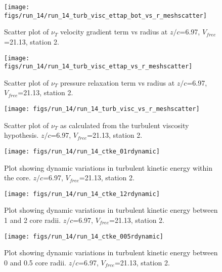 \begin{figure}[H]
\centering
\texttt{[image: figs/run\_14/run\_14\_turb\_visc\_ettap\_bot\_vs\_r\_meshscatter]}
\caption{Scatter plot of $\nu_T$ velocity gradient term vs radius at $z/c$=6.97, $V_{free}$=21.13, station 2.}
\end{figure}


\begin{figure}[H]
\centering
\texttt{[image: figs/run\_14/run\_14\_turb\_visc\_ettap\_vs\_r\_meshscatter]}
\caption{Scatter plot of $\nu_T$ pressure relaxation term vs radius at $z/c$=6.97, $V_{free}$=21.13, station 2.}
\end{figure}


\begin{figure}[H]
\centering
\texttt{[image: figs/run\_14/run\_14\_turb\_visc\_vs\_r\_meshscatter]}
\caption{Scatter plot of $\nu_T$ as calculated from the turbulent viscosity hypothesis. $z/c$=6.97, $V_{free}$=21.13, station 2.}
\end{figure}


\begin{figure}[H]
\centering
\texttt{[image: figs/run\_14/run\_14\_ctke\_01rdynamic]}
\caption{Plot showing dynamic variations in turbulent kinetic energy within the core. $z/c$=6.97, $V_{free}$=21.13, station 2.}
\end{figure}


\begin{figure}[H]
\centering
\texttt{[image: figs/run\_14/run\_14\_ctke\_12rdynamic]}
\caption{Plot showing dynamic variations in turbulent kinetic energy between 1 and 2 core radii. $z/c$=6.97, $V_{free}$=21.13, station 2.}
\end{figure}


\begin{figure}[H]
\centering
\texttt{[image: figs/run\_14/run\_14\_ctke\_005rdynamic]}
\caption{Plot showing dynamic variations in turbulent kinetic energy between 0 and 0.5 core radii. $z/c$=6.97, $V_{free}$=21.13, station 2.}
\end{figure}


